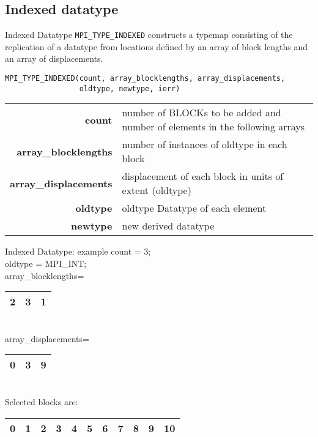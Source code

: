 \documentclass[aspectratio=43]{beamer}
\begin{document}
\subsection{Indexed datatype}
\begin{frame}[fragile]{Indexed Datatype}
\verb+MPI_TYPE_INDEXED+ constructs a typemap consisting of the replication of a datatype from locations defined by an array of block lengths and an array of displacements.
\footnotesize
\begin{verbatim}
MPI_TYPE_INDEXED(count, array_blocklengths, array_displacements,
                 oldtype, newtype, ierr)
\end{verbatim}
\vspace{-0.2cm}
\begin{black1block}{}
\begin{tabular}{rp{6.5cm}}
\textbf{count} & number of BLOCKs to be added and number of elements in the following arrays\\
\textbf{array\_blocklengths} & number of instances of oldtype in each block\\
\textbf{array\_displacements} & displacement of each block in units of extent (oldtype)\\
\textbf{oldtype} & oldtype Datatype of each element\\
\textbf{newtype} & new derived datatype\\
\end{tabular}
\end{black1block}
\end{frame}

\begin{frame}[fragile]{Indexed Datatype: example}
count = 3;\\
oldtype = MPI\_INT;\\
array\_blocklengths=
\begin{tabular}{|c|c|c|}
\hline
2  & 3  & 1 \\
\hline
\end{tabular}\\
array\_displacements=
\begin{tabular}{|c|c|c|}
\hline
0  & 3  & 9 \\
\hline
\end{tabular}\\[0.5cm]

Selected blocks are:
\begin{tabular}{|c|c|c|c|c|c|c|c|c|c|c|}
\hline
\color{cscsred}0  & \color{cscsred}1  & 2 & \color{cscsred}3 & \color{cscsred}4 & \color{cscsred}5 & 6 & 7 & 8 & \color{cscsred}9 & 10\\
\hline
\end{tabular}
\end{frame}
\end{document}
